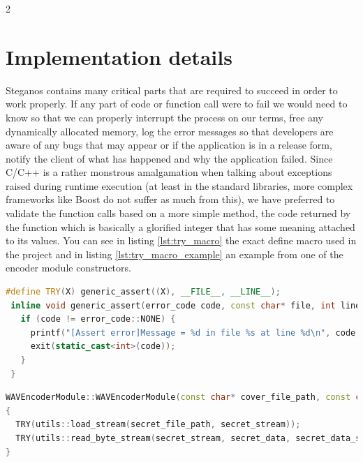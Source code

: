 \begin{multicols}{2}
\section{Implementation details}
Steganos contains many critical parts that are required to succeed in order to work properly. If any part of code or function call were to fail we would need to know so that we can properly interrupt the process on our terms, free any dynamically allocated memory, log the error messages so that developers are aware of any bugs that may appear or if the application is in a release form, notify the client of what has happened and why the application failed. Since C/C++ is a rather monstrous amalgamation when talking about exceptions raised during runtime execution (at least in the standard libraries, more complex frameworks like Boost do not suffer as much from this), we have preferred to validate the function calls based on a more simple method, the code returned by the function which is basically a glorified integer that has some meaning attached to its values. You can see in listing \ref{lst:try_macro} the exact define macro used in the project and in listing \ref{lst:try_macro_example} an example from one of the encoder module constructors.

\end{multicols}
\begin{lstlisting}[language=C++, caption=The TRY macro used for any critical operation,label={lst:try_macro}]
 #define TRY(X) generic_assert((X), __FILE__, __LINE__);
 inline void generic_assert(error_code code, const char* file, int line) {
   if (code != error_code::NONE) {
     printf("[Assert error]Message = %d in file %s at line %d\n", code, file, line);
     exit(static_cast<int>(code));
   }
 }
\end{lstlisting}

\begin{lstlisting}[language=C++, caption=Usage example of the TRY macro,label={lst:try_macro_example}]
WAVEncoderModule::WAVEncoderModule(const char* cover_file_path, const char* secret_file_path) : WAVModule(cover_file_path) 
{
  TRY(utils::load_stream(secret_file_path, secret_stream));
  TRY(utils::read_byte_stream(secret_stream, secret_data, secret_data_size));
}
\end{lstlisting}


